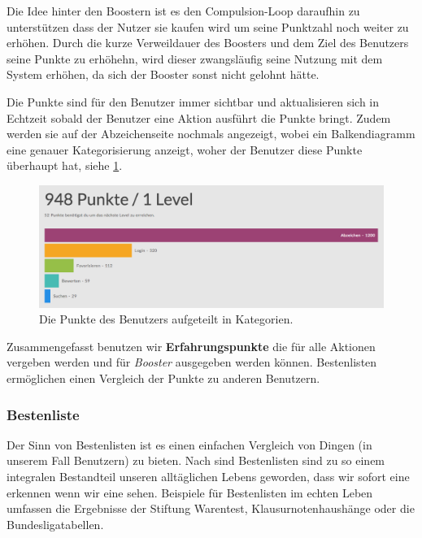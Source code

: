 \documentclass[12pt,twoside]{book}
\begin{document}
Die Idee hinter den Boostern ist es den Compulsion-Loop daraufhin zu unterstützen dass der Nutzer sie kaufen wird um seine Punktzahl noch weiter zu erhöhen. Durch die kurze Verweildauer des Boosters und dem Ziel des Benutzers seine Punkte zu erhöhehn, wird dieser zwangsläufig seine Nutzung mit dem System erhöhen, da sich der Booster sonst nicht gelohnt hätte.

Die Punkte sind für den Benutzer immer sichtbar und aktualisieren sich in Echtzeit sobald der Benutzer eine Aktion ausführt die Punkte bringt. Zudem werden sie auf der Abzeichenseite nochmals angezeigt, wobei ein Balkendiagramm eine genauer Kategorisierung anzeigt, woher der Benutzer diese Punkte überhaupt hat, siehe \ref{fig:points}.

\begin{figure}[htbp]
    \centering
    \includegraphics[width=1.0\textwidth]{images/infoboard_userstats.png}
    \caption{Die Punkte des Benutzers aufgeteilt in Kategorien.}
    \label{fig:points}
\end{figure}

Zusammengefasst benutzen wir \textbf{Erfahrungspunkte} die für alle Aktionen vergeben werden und für \textit{Booster} ausgegeben werden können. Bestenlisten ermöglichen einen Vergleich der Punkte zu anderen Benutzern.

\subsubsection{Bestenliste}

Der Sinn von Bestenlisten ist es einen einfachen Vergleich von Dingen (in unserem Fall Benutzern) zu bieten. Nach \citep{zichermann2011gamification, 49 - 50} sind Bestenlisten sind zu so einem integralen Bestandteil unseren alltäglichen Lebens geworden, dass wir sofort eine erkennen wenn wir eine sehen. Beispiele für Bestenlisten im echten Leben umfassen die Ergebnisse der Stiftung Warentest, Klausurnotenhaushänge oder die Bundesligatabellen.
\end{document}
